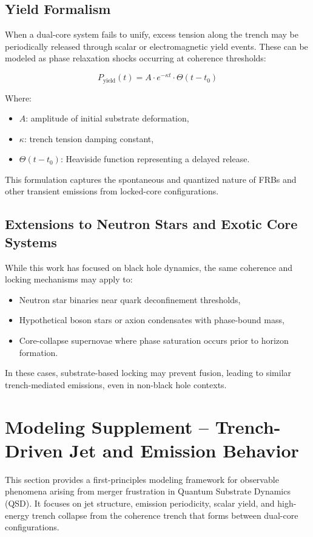 \documentclass[sn-mathphys]{sn-jnl}
\theoremstyle{thmstyleone}%
\theoremstyle{thmstyletwo}%
\theoremstyle{thmstylethree}%
\begin{document}
\subsection{Yield Formalism}

When a dual-core system fails to unify, excess tension along the trench may be periodically released through scalar or electromagnetic yield events. These can be modeled as phase relaxation shocks occurring at coherence thresholds:

$$
P_{\text{yield}}(t) = A \cdot e^{-\kappa t} \cdot \Theta(t - t_0)
$$

Where:
\begin{itemize}
\item $A$: amplitude of initial substrate deformation,
\item $\kappa$: trench tension damping constant,
\item $\Theta(t - t_0)$: Heaviside function representing a delayed release.
\end{itemize}

This formulation captures the spontaneous and quantized nature of FRBs and other transient emissions from locked-core configurations.

\subsection{Extensions to Neutron Stars and Exotic Core Systems}
\label{sec:exotic_extensions}
While this work has focused on black hole dynamics, the same coherence and locking mechanisms may apply to:
\begin{itemize}
\item Neutron star binaries near quark deconfinement thresholds,
\item Hypothetical boson stars or axion condensates with phase-bound mass,
\item Core-collapse supernovae where phase saturation occurs prior to horizon formation.
\end{itemize}

In these cases, substrate-based locking may prevent fusion, leading to similar trench-mediated emissions, even in non-black hole contexts.

\section{Modeling Supplement – Trench-Driven Jet and Emission Behavior}

This section provides a first-principles modeling framework for observable phenomena arising from merger frustration in Quantum Substrate Dynamics (QSD). It focuses on jet structure, emission periodicity, scalar yield, and high-energy trench collapse from the coherence trench that forms between dual-core configurations.
\end{document}
